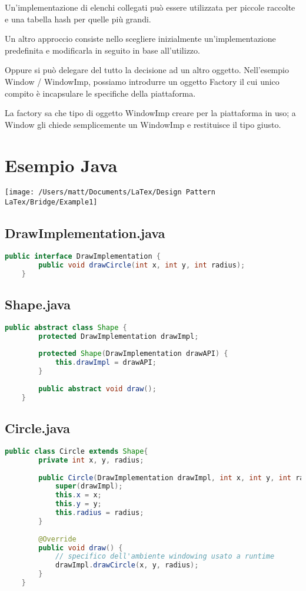 Un'implementazione di elenchi collegati può essere utilizzata per piccole raccolte e una tabella hash per quelle più grandi.

Un altro approccio consiste nello scegliere inizialmente un'implementazione predefinita e modificarla in seguito in base all'utilizzo.

Oppure si può delegare del tutto la decisione ad un altro oggetto. Nell'esempio Window / WindowImp, possiamo introdurre un oggetto Factory il cui unico compito è incapsulare le specifiche della piattaforma.

La factory sa che tipo di oggetto WindowImp creare per la piattaforma in uso; a Window gli chiede semplicemente un WindowImp e restituisce il tipo giusto.


\section{Esempio Java}
\texttt{[image: /Users/matt/Documents/LaTex/Design Pattern LaTex/Bridge/Example1]}

\subsection{DrawImplementation.java}
\begin{lstlisting}[language=java]
    public interface DrawImplementation {
        public void drawCircle(int x, int y, int radius);
    }
\end{lstlisting}

\subsection{Shape.java}
\begin{lstlisting}[language=java]
    public abstract class Shape {
        protected DrawImplementation drawImpl;
    
        protected Shape(DrawImplementation drawAPI) {
            this.drawImpl = drawAPI;
        }
    
        public abstract void draw();
    }
\end{lstlisting}

\subsection{Circle.java}
\begin{lstlisting}[language=java]
    public class Circle extends Shape{
        private int x, y, radius;
    
        public Circle(DrawImplementation drawImpl, int x, int y, int radius) {
            super(drawImpl);
            this.x = x;
            this.y = y;
            this.radius = radius;
        }
    
        @Override
        public void draw() {
            // specifico dell'ambiente windowing usato a runtime
            drawImpl.drawCircle(x, y, radius);
        }
    }
\end{lstlisting}

